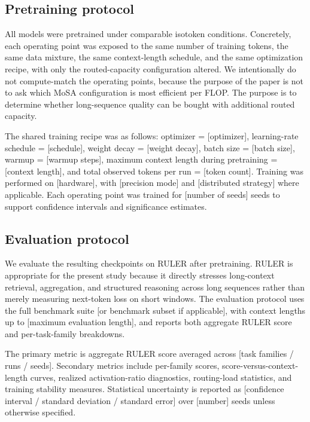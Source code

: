 \documentclass[11pt]{article}
\begin{document}
\subsection{Pretraining protocol}

All models were pretrained under comparable isotoken conditions. Concretely, each operating point was exposed to the same number of training tokens, the same data mixture, the same context-length schedule, and the same optimization recipe, with only the routed-capacity configuration altered. We intentionally do not compute-match the operating points, because the purpose of the paper is not to ask which MoSA configuration is most efficient per FLOP. The purpose is to determine whether long-sequence quality can be bought with additional routed capacity.

The shared training recipe was as follows: optimizer = [optimizer], learning-rate schedule = [schedule], weight decay = [weight decay], batch size = [batch size], warmup = [warmup steps], maximum context length during pretraining = [context length], and total observed tokens per run = [token count]. Training was performed on [hardware], with [precision mode] and [distributed strategy] where applicable. Each operating point was trained for [number of seeds] seeds to support confidence intervals and significance estimates.

\subsection{Evaluation protocol}

We evaluate the resulting checkpoints on RULER after pretraining. RULER is appropriate for the present study because it directly stresses long-context retrieval, aggregation, and structured reasoning across long sequences rather than merely measuring next-token loss on short windows. The evaluation protocol uses the full benchmark suite [or benchmark subset if applicable], with context lengths up to [maximum evaluation length], and reports both aggregate RULER score and per-task-family breakdowns.

The primary metric is aggregate RULER score averaged across [task families / runs / seeds]. Secondary metrics include per-family scores, score-versus-context-length curves, realized activation-ratio diagnostics, routing-load statistics, and training stability measures. Statistical uncertainty is reported as [confidence interval / standard deviation / standard error] over [number] seeds unless otherwise specified.
\end{document}
